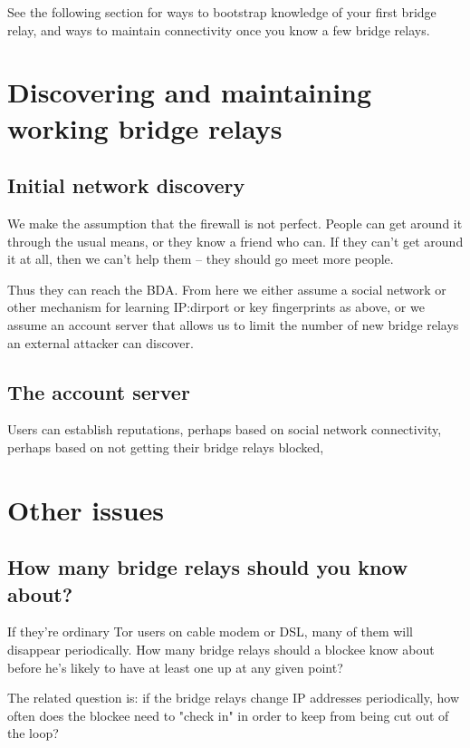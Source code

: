 \documentclass{llncs}
\begin{document}
See the following section for ways to bootstrap knowledge of your first
bridge relay, and ways to maintain connectivity once you know a few
bridge relays.

\section{Discovering and maintaining working bridge relays}

\subsection{Initial network discovery}

We make the assumption that the firewall is not perfect. People can
get around it through the usual means, or they know a friend who can.
If they can't get around it at all, then we can't help them -- they
should go meet more people.

Thus they can reach the BDA. From here we either assume a social
network or other mechanism for learning IP:dirport or key fingerprints
as above, or we assume an account server that allows us to limit the
number of new bridge relays an external attacker can discover.

\subsection{The account server}

Users can establish reputations, perhaps based on social network
connectivity, perhaps based on not getting their bridge relays blocked,



\section{Other issues}

\subsection{How many bridge relays should you know about?}

If they're ordinary Tor users on cable modem or DSL, many of them will
disappear periodically. How many bridge relays should a blockee know
about before he's likely to have at least one up at any given point?

The related question is: if the bridge relays change IP addresses
periodically, how often does the blockee need to "check in" in order
to keep from being cut out of the loop?
\end{document}
